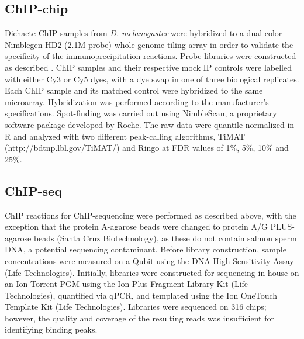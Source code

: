 \subsection{ChIP-chip}
Dichaete ChIP samples from \emph{D. melanogaster} were hybridized to a dual-color Nimblegen HD2 (2.1M probe) whole-genome tiling array in order to validate the specificity of the immunoprecipitation reactions. Probe libraries were constructed as described \citep{sandmann_chip--chip_2007}. ChIP samples and their respective mock IP controls were labelled with either Cy3 or Cy5 dyes, with a dye swap in one of three biological replicates. Each ChIP sample and its matched control were hybridized to the same microarray. Hybridization was performed according to the manufacturer’s specifications. Spot-finding was carried out using NimbleScan, a proprietary software package developed by Roche. The raw data were quantile-normalized in R and analyzed with two different peak-calling algorithms, TiMAT (http://bdtnp.lbl.gov/TiMAT/) and Ringo \citep{toedling_ringor/bioconductor_2007} at FDR values of 1\%, 5\%, 10\% and 25\%.
\subsection{ChIP-seq}
ChIP reactions for ChIP-sequencing were performed as described above, with the exception that the protein A-agarose beads were changed to protein A/G PLUS-agarose beads (Santa Cruz Biotechnology), as these do not contain salmon sperm DNA, a potential sequencing contaminant. Before library construction, sample concentrations were measured on a Qubit using the DNA High Sensitivity Assay (Life Technologies). Initially, libraries were constructed for sequencing in-house on an Ion Torrent PGM using the Ion Plus Fragment Library Kit (Life Technologies), quantified via qPCR, and templated using the Ion OneTouch Template Kit (Life Technologies). Libraries were sequenced on 316 chips; however, the quality and coverage of the resulting reads was insufficient for identifying binding peaks.

